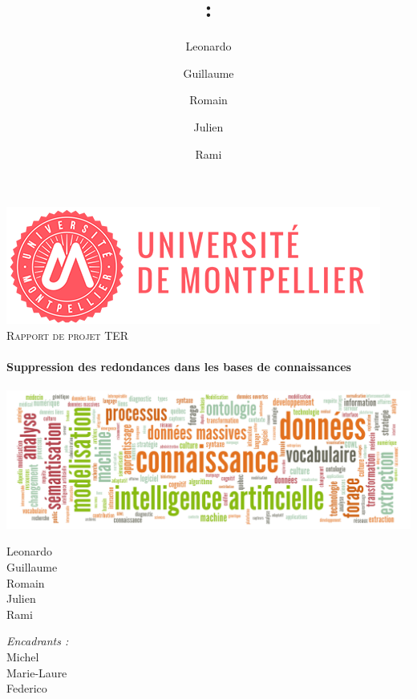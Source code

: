 \documentclass[a4paper]{article}
\title{: \\ }
\author{
  Leonardo \bsc{Moros} \\
  \and
  Guillaume \bsc{Pérution-Kihli} \\
  \and
  Romain \bsc{Ricalens} \\
  \and
  Julien \bsc{Rodriguez} \\
  \and
  Rami \bsc{Younes} \\}
\begin{document}
    \begin{titlepage}
      \begin{sffamily}
            \begin{center}
                \includegraphics[scale=0.6]{pictures/logo_um.png} \\[1cm]
                \textsc{\Large Rapport de projet TER }\\[1cm]
                    
                \HRule \\[0.4cm]{ \huge \bfseries Suppression des redondances dans les bases de connaissances\\[0.4cm] }
                \HRule \\[1.5cm]
                
                \includegraphics[width=\textwidth]{pictures/websem2018-1072x368px.png}
                \\[2cm]
                    
                \begin{minipage}{0.4\textwidth}
                    \begin{flushleft} \large
                        Leonardo  \\
                          Guillaume  \\
                          Romain  \\
                          Julien  \\
                          Rami  
                    \end{flushleft}
                \end{minipage}
                \begin{minipage}{0.4\textwidth}
                    \begin{flushright} \large
                        \emph{Encadrants :} \\ Michel  \\ Marie-Laure  \\ Federico 
                    \end{flushright}
                \end{minipage}
                    

\end{center}
\end{sffamily}
\end{titlepage}
\end{document}
